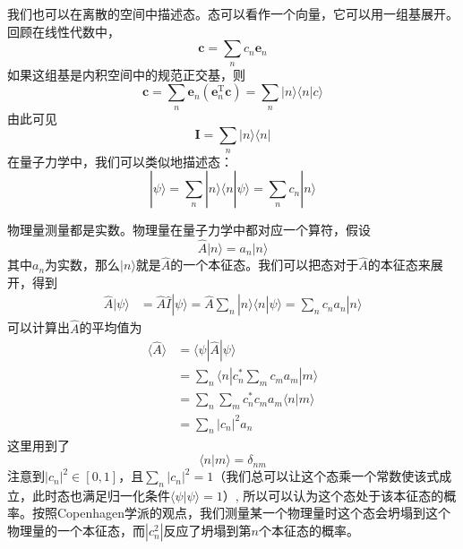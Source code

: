 \documentclass[12pt]{article}
\begin{document}
    我们也可以在离散的空间中描述态。态可以看作一个向量，它可以用一组基展开。回顾在线性代数中，
    \begin{equation*}
        \bm{c} = \sum_n c_n \bm{e}_n
    \end{equation*}
    如果这组基是内积空间中的规范正交基，则
    \begin{equation*}
        \bm{c} = \sum_n \bm{e}_n (\bm{e}_n^\mathrm{T}\bm{c}) 
        = \sum_n |n\rangle \langle n|c\rangle
    \end{equation*}
    由此可见
    \begin{equation*}
        \bm{I} = \sum_n |n\rangle \langle n|
    \end{equation*}
    在量子力学中，我们可以类似地描述态：
    \begin{equation*}
        |\psi \rangle = \sum_n |n\rangle \langle n|\psi \rangle = \sum_n c_n |n\rangle
    \end{equation*}

    物理量测量都是实数。物理量在量子力学中都对应一个算符，假设
    \begin{equation*}
        \hat{A} |n\rangle = a_n |n\rangle
    \end{equation*}
    其中$a_n$为实数，那么$|n\rangle$就是$\hat{A}$的一个本征态。我们可以把态对于$\hat{A}$的本征态来展开，得到
    \begin{align*}
        \hat{A}|\psi \rangle &= \hat{A}\hat{I}|\psi \rangle
        = \hat{A} \sum_n |n\rangle \langle n|\psi\rangle
        = \sum_n c_n a_n |n\rangle
    \end{align*}
    可以计算出$\hat{A}$的平均值为
    \begin{align*}
        \langle \hat{A} \rangle &= \langle \psi |\hat{A}| \psi \rangle\\
        &= \sum_n \langle n| c_n^* \sum_m c_m a_m |m\rangle\\
        &= \sum_n \sum_m c_n^* c_m a_m \langle n|m\rangle\\
        &= \sum_n |c_n|^2 a_n
    \end{align*}
    这里用到了
    \[\langle n | m \rangle = \delta_{nm}\]
    注意到$|c_n|^2 \in [0,1]$，且$\sum_n |c_n|^2 = 1$（我们总可以让这个态乘一个常数使该式成立，此时态也满足归一化条件$\langle \psi |\psi \rangle = 1$）, 所以可以认为这个态处于该本征态的概率。按照Copenhagen学派的观点，我们测量某一个物理量时这个态会坍塌到这个物理量的一个本征态，而$|c_n^2|$反应了坍塌到第$n$个本征态的概率。
\end{document}
